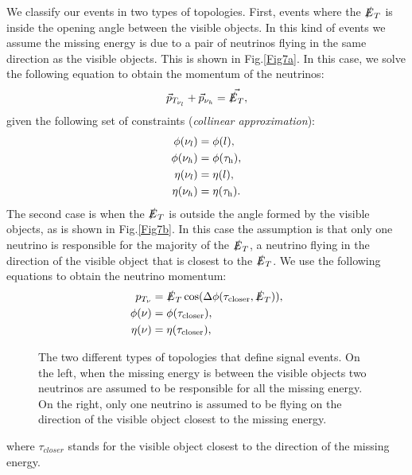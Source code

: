 We classify our events in two types of topologies. First, events where the $\slashed{E}_T$ is inside the opening angle between the visible objects. In this kind of events we assume the missing energy is due to a pair of neutrinos flying in the same direction as the visible objects. This is shown in Fig.\ref{Fig7a}. In this case, we solve the following equation to obtain the momentum of the neutrinos:
\begin{equation}
	\vec{p}_{T_{\nu_l}}+\vec{p}_{\nu_h}=\vec{\slashed{E}_T},
\end{equation}
given the following set of constraints (\textit{collinear approximation}):
\begin{align}
	\phi(\nu_l)&=\phi(l),
	\\
	\phi(\nu_h)&=\phi(\tau_\text{h}),
	\\
	\eta(\nu_l)&=\eta(l),
	\\
	\eta(\nu_h)&=\eta(\tau_\text{h}).
\end{align}
The second case is when the $\slashed{E}_T$ is outside the angle formed by the visible objects, as is shown in Fig.\ref{Fig7b}. In this case the assumption is that only one neutrino is responsible for the majority of the $\slashed{E}_T$, a neutrino flying in the direction of the visible object that is closest to the $\slashed{E}_T$. We use the following equations to obtain the neutrino momentum:
\begin{align}
p_{T_{\nu}}&=\slashed{E}_T \cos(\Delta\phi(\tau_{\text{closer}},\slashed{E}_T)),
\\
\phi(\nu)&=\phi(\tau_{\text{closer}}),
\\
\eta(\nu)&=\eta(\tau_{\text{closer}}),
\end{align} 
\begin{figure}[ht]
	\centering
	\hfill
	\caption{The two different types of topologies that define signal events. On the left, when the missing energy is between the visible objects two neutrinos are assumed to be responsible for all the missing energy. On the right, only one neutrino is assumed to be flying on the direction of the visible object closest to the missing energy.}
	\label{Fig7}
\end{figure}
where $\tau_{closer}$ stands for the visible object closest to the direction of the missing energy.

